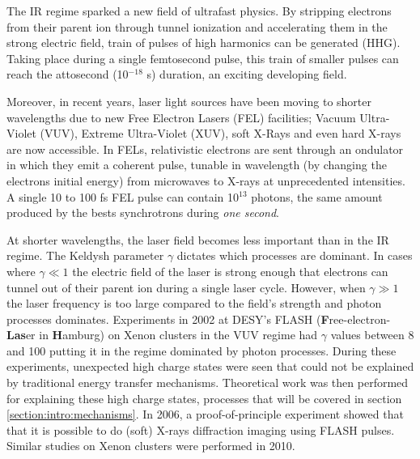 The IR regime sparked a new field of ultrafast physics. By stripping electrons
from their parent ion through tunnel ionization and accelerating them in the
strong electric field, train of pulses of high harmonics can be generated (HHG).
Taking place during a single femtosecond pulse, this train of smaller pulses
can reach the attosecond (10$^{-18}$ s) duration, an exciting developing field.

Moreover, in recent years, laser light sources
have been moving to shorter wavelengths due to new Free Electron Lasers (FEL)
facilities; Vacuum Ultra-Violet (VUV), Extreme Ultra-Violet (XUV), soft X-Rays
and even hard X-rays are now accessible. In FELs, relativistic electrons are sent
through an ondulator in which they emit a coherent pulse, tunable in wavelength
(by changing the electrons initial energy)
from microwaves to X-rays\cite{Brabec2009,Ackermann2007a,Pellegrini2012} at
unprecedented intensities. A single 10 to 100 fs FEL pulse can contain 10$^{13}$
photons, the same amount produced by the bests synchrotrons during
\textit{one second}\cite{Bostedt2009}.

At shorter wavelengths, the laser field becomes less important than in the IR
regime. The Keldysh parameter $\gamma$ dictates which processes are dominant. In
cases where $\gamma \ll 1$ the electric field of the laser is strong enough that
electrons can tunnel out of their parent ion during a single laser cycle.
However, when $\gamma \gg 1$ the laser frequency is too large compared to the
field's strength and photon processes dominates. Experiments in 2002\cite{Wabnitz2002} at
DESY's FLASH (\textbf{F}ree-electron-\textbf{Las}er in \textbf{H}amburg)\cite{Bostedt2009}
on Xenon clusters in the VUV regime had $\gamma$ values between 8 and
100 putting it in the regime dominated by photon processes.
During these experiments, unexpected high charge states were seen that could not
be explained by traditional energy transfer mechanisms. Theoretical work was
then performed for explaining these high charge states, processes that will be
covered in section \ref{section:intro:mechanisms}.
In 2006, a proof-of-principle experiment showed that that it is possible to
do (soft) X-rays diffraction imaging using FLASH pulses\cite{Chapman2006}.
Similar studies on Xenon clusters were performed in 2010\cite{Bostedt2010}.

